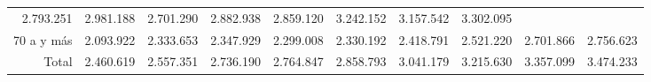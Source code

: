 \begin{tabular}{llllllllll}
  \multicolumn{1}{r}{2.793.251} &
  \multicolumn{1}{r}{2.981.188} &
  \multicolumn{1}{r}{2.701.290} &
  \multicolumn{1}{r}{2.882.938} &
  \multicolumn{1}{r}{2.859.120} &
  \multicolumn{1}{r}{3.242.152} &
  \multicolumn{1}{r}{3.157.542} &
  \multicolumn{1}{r}{3.302.095} \\
\multicolumn{1}{r}{70 a y más\hspace{1em}} &
  \multicolumn{1}{|r}{2.093.922} &
  \multicolumn{1}{r}{2.333.653} &
  \multicolumn{1}{r}{2.347.929} &
  \multicolumn{1}{r}{2.299.008} &
  \multicolumn{1}{r}{2.330.192} &
  \multicolumn{1}{r}{2.418.791} &
  \multicolumn{1}{r}{2.521.220} &
  \multicolumn{1}{r}{2.701.866} &
  \multicolumn{1}{r}{2.756.623} \\
\multicolumn{1}{r}{Total\hspace{1em}} &
  \multicolumn{1}{|r}{2.460.619} &
  \multicolumn{1}{r}{2.557.351} &
  \multicolumn{1}{r}{2.736.190} &
  \multicolumn{1}{r}{2.764.847} &
  \multicolumn{1}{r}{2.858.793} &
  \multicolumn{1}{r}{3.041.179} &
  \multicolumn{1}{r}{3.215.630} &
  \multicolumn{1}{r}{3.357.099} &
  \multicolumn{1}{r}{3.474.233} \\
\cline{1-10}
\end{tabular}
